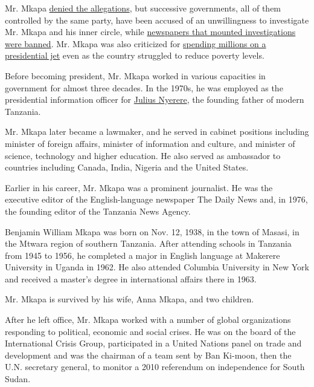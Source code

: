 Mr. Mkapa
\href{https://www.thecitizen.co.tz/news/Former-President-Benjamin-Mkapa-bares-it-all-his-memoir--/1840340-5347096-3201j8/index.html}{denied
the allegations}, but successive governments, all of them controlled by
the same party, have been accused of an unwillingness to investigate Mr.
Mkapa and his inner circle, while
\href{https://www.thecitizen.co.tz/news/-Tabloid-banned-for-2-years-for-linking-former-presidents-/1840340-3972404-w40es0/index.html}{newspapers
that mounted investigations were banned}. Mr. Mkapa was also criticized
for \href{http://news.bbc.co.uk/2/hi/africa/3719712.stm}{spending
millions on a presidential jet} even as the country struggled to reduce
poverty levels.

Before becoming president, Mr. Mkapa worked in various capacities in
government for almost three decades. In the 1970s, he was employed as
the presidential information officer for
\href{https://www.nytimes3xbfgragh.onion/1999/10/15/world/julius-nyerere-of-tanzania-dies-preached-african-socialism-to-the-world.html}{Julius
Nyerere}, the founding father of modern Tanzania.

Mr. Mkapa later became a lawmaker, and he served in cabinet positions
including minister of foreign affairs, minister of information and
culture, and minister of science, technology and higher education. He
also served as ambassador to countries including Canada, India, Nigeria
and the United States.

Earlier in his career, Mr. Mkapa was a prominent journalist. He was the
executive editor of the English-language newspaper The Daily News and,
in 1976, the founding editor of the Tanzania News Agency.

Benjamin William Mkapa was born on Nov. 12, 1938, in the town of Masasi,
in the Mtwara region of southern Tanzania. After attending schools in
Tanzania from 1945 to 1956, he completed a major in English language at
Makerere University in Uganda in 1962. He also attended Columbia
University in New York and received a master's degree in international
affairs there in 1963.

Mr. Mkapa is survived by his wife, Anna Mkapa, and two children.

After he left office, Mr. Mkapa worked with a number of global
organizations responding to political, economic and social crises. He
was on the board of the International Crisis Group, participated in a
United Nations panel on trade and development and was the chairman of a
team sent by Ban Ki-moon, then the U.N. secretary general, to monitor a
2010 referendum on independence for South Sudan.

